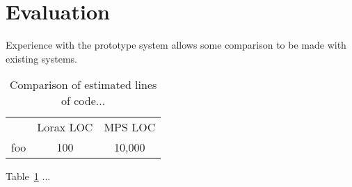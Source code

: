 \section{Evaluation}
\label{eval}

Experience with the prototype system allows some comparison to be made with existing systems.

\begin{table}
	\centering
	
	\begin{tabular}{lcc}
	 & Lorax LOC & MPS LOC
	\\
	foo & 100 & 10,000
	\end{tabular}
	
	\caption{Comparison of estimated lines of code...}
	\label{table-loc}
\end{table}

Table~\ref{table-loc} ...
